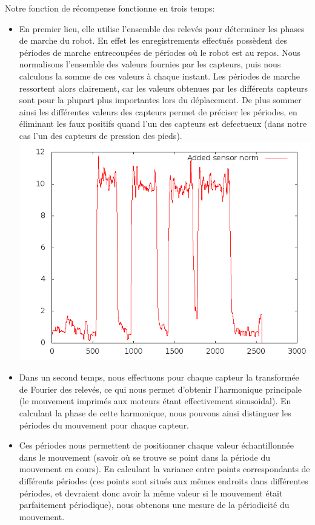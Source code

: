 \documentclass[11pt]{article}
\begin{document}
Notre fonction de récompense fonctionne en trois temps:
\begin{itemize}
\item En premier lieu, elle utilise l'ensemble des relevés pour déterminer les phases de marche du robot. En effet les enregistrements effectués possèdent des périodes de marche entrecoupées de périodes où le robot est au repos. Nous normalisons l'ensemble des valeurs fournies par les capteurs, puis nous calculons la somme de ces valeurs à chaque instant. Les périodes de marche ressortent alors clairement, car les valeurs obtenues par les différents capteurs sont pour la plupart plus importantes lors du déplacement. De plus sommer ainsi les différentes valeurs des capteurs permet de préciser les périodes, en éliminant les faux positifs quand l'un des capteurs est defectueux (dans notre cas l'un des capteurs de pression des pieds).
\includegraphics[scale=0.4]{walks.png}
\item Dans un second temps, nous effectuons pour chaque capteur la transformée de Fourier des relevés, ce qui nous permet d'obtenir l'harmonique principale (le mouvement imprimés aux moteurs étant effectivement sinusoidal). En calculant la phase de cette harmonique, nous pouvons ainsi distinguer les périodes du mouvement pour chaque capteur.
\item Ces périodes nous permettent de positionner chaque valeur échantillonnée dans le mouvement (savoir où se trouve se point dans la période du mouvement en cours). En calculant la variance entre points correspondants de différents périodes (ces points sont situés aux mêmes endroits dans différentes périodes, et devraient donc avoir la même valeur si le mouvement était parfaitement périodique), nous obtenons une mesure de la périodicité du mouvement. 

\end{itemize}
\end{document}
